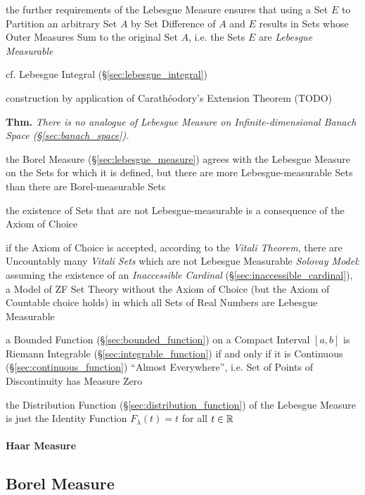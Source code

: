 the further requirements of the Lebesgue Measure ensures that using a Set $E$ to
Partition an arbitrary Set $A$ by Set Difference of $A$ and $E$ results in Sets
whose Outer Measures Sum to the original Set $A$, i.e. the Sets $E$ are
\emph{Lebesgue Measurable}

\fist cf. Lebesgue Integral (\S\ref{sec:lebesgue_integral})

construction by application of Carath\'eodory's Extension Theorem (TODO)

\textbf{Thm.} \emph{
  There is no analogue of Lebesgue Measure on Infinite-dimensional Banach Space
  (\S\ref{sec:banach_space}).
}

the Borel Measure (\S\ref{sec:lebesgue_measure}) agrees with the Lebesgue
Measure on the Sets for which it is defined, but there are more
Lebesgue-measurable Sets than there are Borel-measurable Sets

the existence of Sets that are not Lebesgue-measurable is a consequence of the
Axiom of Choice

if the Axiom of Choice is accepted, according to the \emph{Vitali Theorem},
there are Uncountably many \emph{Vitali Sets} which are not Lebesgue Measurable
\emph{Solovay Model}: assuming the existence of an \emph{Inaccessible Cardinal}
(\S\ref{sec:inaccessible_cardinal}), a Model of ZF Set Theory without the Axiom
of Choice (but the Axiom of Countable choice holds) in which all Sets of Real
Numbers are Lebesgue Measurable

a Bounded Function (\S\ref{sec:bounded_function}) on a Compact Interval $[a,b]$
is Riemann Integrable (\S\ref{sec:integrable_function}) if and only if it is
Continuous (\S\ref{sec:continuous_function}) ``Almost Everywhere'', i.e. Set of
Points of Discontinuity has Measure Zero

the Distribution Function (\S\ref{sec:distribution_function}) of the Lebesgue
Measure is just the Identity Function $F_\lambda(t) = t$ for all $t \in \mathbb{R}$



\paragraph{Haar Measure}\label{sec:haar_measure}\hfill



\subsection{Borel Measure}\label{sec:borel_measure}

